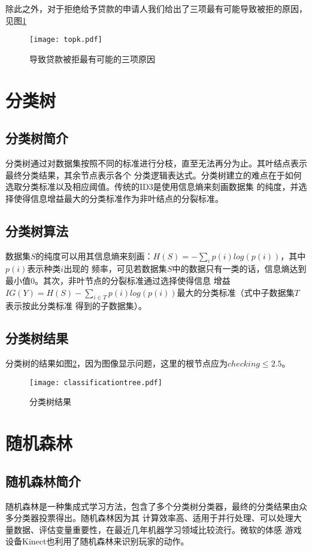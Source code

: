 除此之外，对于拒绝给予贷款的申请人我们给出了三项最有可能导致被拒的原因，见图\ref{fig:topk}

\begin{figure}
\centering
\texttt{[image: topk.pdf]}
\caption{\label{fig:topk}导致贷款被拒最有可能的三项原因}
\end{figure}

\section{分类树}
\subsection{分类树简介}
分类树通过对数据集按照不同的标准进行分枝，直至无法再分为止。其叶结点表示最终分类结果，其余节点表示各个
分类逻辑表达式。分类树建立的难点在于如何选取分类标准以及相应阈值。传统的ID3是使用信息熵来刻画数据集
的纯度，并选择使得信息增益最大的分类标准作为非叶结点的分裂标准。

\subsection{分类树算法}
数据集$S$的纯度可以用其信息熵来刻画：$H(S) = - \sum _{i} p(i) log(p(i))$，其中$p(i)$表示种类$i$出现的
频率，可见若数据集$S$中的数据只有一类的话，信息熵达到最小值0。其次，非叶节点的分裂标准通过选择使得信息
增益$IG(Y) = H(S) - \sum_{i \in T} p(i) log(p(i))$最大的分类标准（式中子数据集$T$表示按此分类标准
得到的子数据集）。

\subsection{分类树结果}
分类树的结果如图\ref{fig:classification}，因为图像显示问题，这里的根节点应为$checking \le 2.5$。
\begin{figure}
\centering
\texttt{[image: classificationtree.pdf]}
\caption{\label{fig:classification}分类树结果}
\end{figure}

\section{随机森林}

\subsection{随机森林简介}
随机森林是一种集成式学习方法，包含了多个分类树分类器，最终的分类结果由众多分类器投票得出。随机森林因为其
计算效率高、适用于并行处理、可以处理大量数据、评估变量重要性，在最近几年机器学习领域比较流行。微软的体感
游戏设备Kinect也利用了随机森林来识别玩家的动作。

